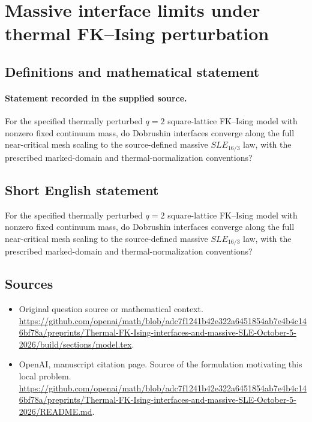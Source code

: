 \documentclass[11pt]{article}
\begin{document}
\section*{Massive interface limits under thermal FK–Ising perturbation}\label{30007399}
\subsection{Definitions and mathematical statement}
\paragraph{Statement recorded in the supplied source.}
For the specified thermally perturbed $q=2$ square-lattice FK–Ising model with nonzero fixed continuum mass, do Dobrushin interfaces converge along the full near-critical mesh scaling to the source-defined massive $SLE_{16/3}$ law, with the prescribed marked-domain and thermal-normalization conventions?
\subsection{Short English statement}
For the specified thermally perturbed $q=2$ square-lattice FK–Ising model with nonzero fixed continuum mass, do Dobrushin interfaces converge along the full near-critical mesh scaling to the source-defined massive $SLE_{16/3}$ law, with the prescribed marked-domain and thermal-normalization conventions?
\subsection{Sources}
\begin{itemize}
\item[S1] Original question source or mathematical context.
\url{https://github.com/openai/math/blob/adc7f1241b42e322a6451854ab7e4b4c146bf78a/preprints/Thermal-FK-Ising-interfaces-and-massive-SLE-October-5-2026/build/sections/model.tex}.
\item[S2] OpenAI, manuscript citation page. Source of the formulation motivating this local problem.
\url{https://github.com/openai/math/blob/adc7f1241b42e322a6451854ab7e4b4c146bf78a/preprints/Thermal-FK-Ising-interfaces-and-massive-SLE-October-5-2026/README.md}.
\end{itemize}
\end{document}
